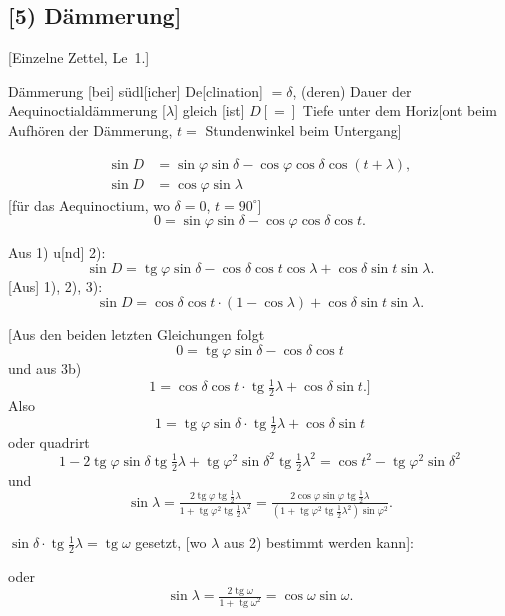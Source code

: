 \documentclass[12pt,a4paper]{article}
\theoremstyle{plain}
\theoremstyle{definition}
\theoremstyle{remark}
\DeclareMathOperator{\tg}{tg}
\begin{document}
\newpage

\subsection*{[5) D\"ammerung]}

[Einzelne Zettel, Le~1.]

D\"ammerung [bei] s\"udl[icher] De[clination] $=\delta$, (deren) Dauer der Aequinoctiald\"ammerung [$\lambda$] gleich [ist] $D [=]$ Tiefe unter dem Horiz[ont beim Aufh\"oren der D\"ammerung, $t =$ Stundenwinkel beim Untergang]

\begin{align}
\sin D &= \sin\varphi \sin\delta - \cos\varphi \cos\delta \cos(t + \lambda), \\
\sin D &= \cos\varphi \sin\lambda
\end{align}
[f\"ur das Aequinoctium, wo $\delta = 0$, $t = 90^{\circ}$]
\begin{equation}
0 = \sin\varphi \sin\delta - \cos\varphi \cos\delta \cos t.
\end{equation}

Aus 1) u[nd] 2):
\begin{equation}
\sin D = \tg\varphi \sin\delta - \cos\delta \cos t \cos\lambda + \cos\delta \sin t \sin\lambda.
\end{equation}
[Aus] 1), 2), 3):
\begin{equation}
\sin D = \cos\delta \cos t \cdot (1 - \cos\lambda) + \cos\delta \sin t \sin\lambda.
\end{equation}

[Aus den beiden letzten Gleichungen folgt
\[
0 = \tg\varphi \sin\delta - \cos\delta \cos t
\]
und aus 3b)
\[
1 = \cos\delta \cos t \cdot \tg\tfrac{1}{2}\lambda + \cos\delta \sin t.]
\]
Also
\begin{equation}
1 = \tg\varphi \sin\delta \cdot \tg\tfrac{1}{2}\lambda + \cos\delta \sin t
\end{equation}
oder quadrirt
\[
1 - 2\tg\varphi \sin\delta \tg\tfrac{1}{2}\lambda + \tg\varphi^2 \sin\delta^2 \tg\tfrac{1}{2}\lambda^2 = \cos t^2 - \tg\varphi^2 \sin\delta^2
\]
und
\[
\sin\lambda = \tfrac{2\tg\varphi \tg\tfrac{1}{2}\lambda}{1 + \tg\varphi^2 \tg\tfrac{1}{2}\lambda^2} = \tfrac{2\cos\varphi \sin\varphi \tg\tfrac{1}{2}\lambda}{(1 + \tg\varphi^2 \tg\tfrac{1}{2}\lambda^2) \sin\varphi^2}.
\]

$\sin\delta \cdot \tg\tfrac{1}{2}\lambda = \tg\omega$ gesetzt, [wo $\lambda$ aus 2) bestimmt werden kann]:

oder
\[
\sin\lambda = \tfrac{2\tg\omega}{1 + \tg\omega^2} = \cos\omega \sin\omega.
\]
\end{document}

